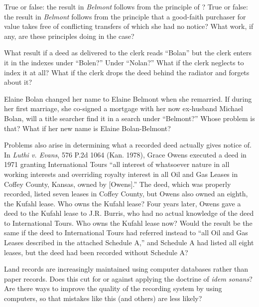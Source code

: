 
\item True or false: the result in \textit{Belmont} follows from the principle
of \textit{}? True or false: the result in \textit{Belmont}
follows
from the principle that a good-faith purchaser for value takes free of
conflicting transfers of which she had no notice? What work, if any, are these
principles doing in the case?


\item What result if a deed as delivered to the clerk reads ``Bolan'' but the
clerk enters it in the indexes under ``Bolen?'' Under ``Nolan?'' What if the
clerk neglects to index it at all? What if the clerk drops the deed behind the
radiator and forgets about it?


\item Elaine Bolan changed her name to Elaine Belmont when she remarried. If
during her first marriage, she co-signed a mortgage with her now ex-husband
Michael Bolan, will a title searcher find it in a search under ``Belmont?''
Whose problem is that? What if her new name is Elaine Bolan-Belmont?


\item Problems also arise in determining what a recorded deed actually gives
notice of. In \textit{Luthi v. Evans}, 576 P.2d 1064 (Kan. 1978), Grace Owens
executed a deed in 1971 granting International Tours {}``all interest of
whatsoever nature in all working interests and overriding royalty interest in
all Oil and Gas Leases in Coffey County, Kansas, owned by [Owens].'' The deed,
which was properly recorded, listed seven leases in Coffey County, but Owens
also owned an eighth, the Kufahl lease. Who owns the Kufahl lease? Four years
later, Owens gave a deed to the Kufahl lease to J.R. Burris, who had no actual
knowledge of the deed to International Tours. Who owns the Kufahl lease now?
Would the result be the same if the deed to International Tours had referred
instead to ``all Oil and Gas Leases described in the attached Schedule A,'' and
Schedule A had listed all eight leases, but the deed had been recorded without
Schedule A?


\item Land records are increasingly maintained using computer databases rather
than paper records. Does this cut for or against applying the doctrine of
\textit{idem sonans}? Are there ways to improve the quality of the recording
system by using computers, so that mistakes like this (and others) are less
likely?


